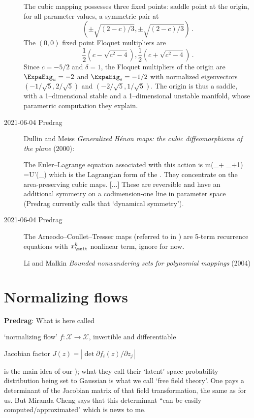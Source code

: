 \begin{description}
The cubic mapping possesses three fixed points: saddle point at the
origin, for all parameter values, a symmetric pair at
\[
\left(\pm\sqrt{(2-c)/3},\pm\sqrt{(2-c)/3}\right)
\,.
\]
The $(0,0)$ fixed point Floquet multipliers are
\begin{equation}
   \frac{1}{2}\left(c-\sqrt{c^2-4}\right),
   \frac{1}{2}\left(c+\sqrt{c^2-4}\right)
   \,.
\end{equation}
Since $c=-5/2$ and $\delta=1$, the Floquet multipliers of the origin are
$\ExpaEig_u = -2$ and $\ExpaEig_s = -1/2$
with normalized eigenvectors
$(-1/\sqrt{5}, 2/\sqrt{5})$ and $(-2/\sqrt{5}, 1/\sqrt{5})$.
The origin is thus a saddle, with a 1--dimensional stable and a 1--dimensional
unstable manifold, whose parametric computation they explain.

\item[2021-06-04 Predrag]
Dullin and Meiss
{\em Generalized {H{\'{e}}non} maps: the cubic diffeomorphisms of the plane}
(2000):

 The Euler–Lagrange equation associated with this action is
\beq
 m(\ssp_{}+ \ssp_{\zeit+1}) =U'(\ssp_{\zeit})
which is the Lagrangian form of the \HenonMap.
They concentrate on the area-preserving cubic maps. [...]
These are reversible and have an additional symmetry on a codimension-one
line in parameter space (Predrag currently calls that `dynamical symmetry').

\item[2021-06-04 Predrag]
The Arneodo–Coullet–Tresser maps (referred to in ) are
5-term recurrence equations with $\ssp_\zeit^k$ nonlinear term, ignore for now.

Li and Malkin
   {\em Bounded nonwandering sets for polynomial mappings} (2004)


\end{description}


\section{Normalizing flows}
\label{sect:discFTblog}

\textbf{Predrag}: What is here called

   `normalizing flow' \(f: \mathcal{X} \rightarrow \mathcal{X}\),
  invertible and differentiable

  Jacobian factor \(J(z) = |\det \partial f_i(z) / \partial z_j|\)

\noindent
is the main
idea of our ); what they call their
`latent' space probability distribution being set to Gaussian is what we
call `free field theory'. One pays a determinant of the Jacobian matrix
of that field transformation, the same as for us. But Miranda Cheng says
that this determinant ``can be easily computed/approximated" which is
news to me.

